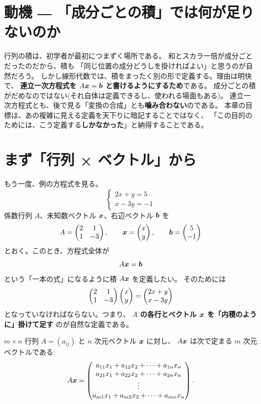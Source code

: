 \section{動機 ― 「成分ごとの積」では何が足りないのか}

行列の積は、初学者が最初につまずく場所である。
和とスカラー倍が成分ごとだったのだから、積も
「同じ位置の成分どうしを掛ければよい」と思うのが自然だろう。
しかし線形代数では、積をまったく別の形で定義する。理由は明快で、
\textbf{連立一次方程式を $A\bm{x} = \bm{b}$ と書けるようにするため}である。
成分ごとの積がだめなのではない(それ自体は定義できるし、使われる場面もある)。
連立一次方程式とも、後で見る「変換の合成」とも\textbf{噛み合わない}のである。
本章の目標は、あの複雑に見える定義を天下りに暗記することではなく、
「この目的のためには、こう定義する\textbf{しかなかった}」と納得することである。

\section{まず「行列 × ベクトル」から}

もう一度、例の方程式を見る。
\[
\begin{cases}
2x + y = 5 \\
x - 3y = -1
\end{cases}
\]
係数行列 $A$、未知数ベクトル $\bm{x}$、右辺ベクトル $\bm{b}$ を
\[
A = \begin{pmatrix}2 & 1 \\ 1 & -3\end{pmatrix}, \qquad
\bm{x} = \begin{pmatrix}x \\ y\end{pmatrix}, \qquad
\bm{b} = \begin{pmatrix}5 \\ -1\end{pmatrix}
\]
とおく。このとき、方程式全体が
\[
A \bm{x} = \bm{b}
\]
という「一本の式」になるように積 $A\bm{x}$ を定義したい。
そのためには
\[
\begin{pmatrix}2 & 1 \\ 1 & -3\end{pmatrix} \begin{pmatrix}x \\ y\end{pmatrix} = \begin{pmatrix}2x + y \\ x - 3y\end{pmatrix}
\]
となっていなければならない。つまり、
\textbf{$A$ の各行とベクトル $\bm{x}$ を「内積のように」掛けて足す}
のが自然な定義である。

\begin{teigi}[行列とベクトルの積]
$m \times n$ 行列 $A = (a_{ij})$ と $n$ 次元ベクトル $\bm{x}$ に対し、
$A\bm{x}$ は次で定まる $m$ 次元ベクトルである:
\[
A\bm{x} = \begin{pmatrix}
a_{11} x_1 + a_{12} x_2 + \cdots + a_{1n} x_n \\
a_{21} x_1 + a_{22} x_2 + \cdots + a_{2n} x_n \\
\vdots \\
a_{m1} x_1 + a_{m2} x_2 + \cdots + a_{mn} x_n
\end{pmatrix}.
\]
\end{teigi}

